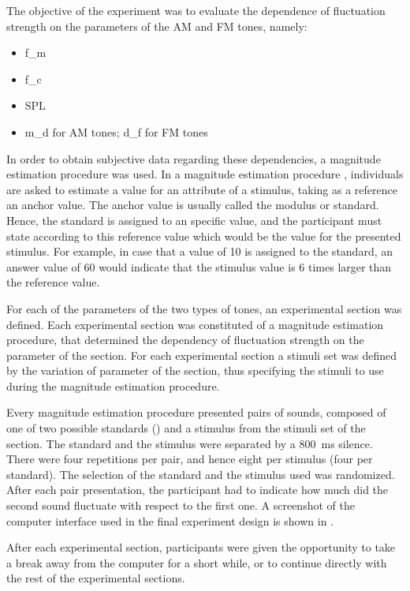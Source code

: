 \documentclass[../main.tex]{subfiles}
\begin{document}
The objective of the experiment was to evaluate the dependence of fluctuation
strength on the parameters of the \gls{AM} and \gls{FM} tones, namely:
\begin{itemize}
  \item \Gls{f_m}
  \item \Gls{f_c}
  \item \Gls{SPL}
  \item \Gls{m_d} for \gls{AM} tones; \gls{d_f} for \gls{FM} tones
\end{itemize}

In order to obtain subjective data regarding these dependencies, a magnitude
estimation procedure was used. In a magnitude estimation procedure
\cite[pp.~9]{Fastl2007Psychoacoustics}, individuals are asked to estimate a
value for an attribute of a stimulus, taking as a reference an anchor value.
The anchor value is usually called the modulus or standard. Hence, the standard
is assigned to an specific value, and the participant must state according to
this reference value which would be the value for the presented stimulus. For
example, in case that a value of 10 is assigned to the standard, an answer value
of 60 would indicate that the stimulus value is 6 times larger than the
reference value.

For each of the parameters of the two types of tones, an experimental section
was defined. Each experimental section was constituted of a magnitude estimation
procedure, that determined the dependency of fluctuation strength on the
parameter of the section. For each experimental section a stimuli set was
defined by the variation of parameter of the section, thus specifying the
stimuli to use during the magnitude estimation procedure.

Every magnitude estimation procedure presented pairs of sounds, composed of one
of two possible standards () and a stimulus from the
stimuli set of the section. The standard and the stimulus were separated by a
800~ms silence. There were four repetitions per pair, and hence eight per
stimulus (four per standard). The selection of the standard and the stimulus
used was randomized. After each pair presentation, the participant had to
indicate how much did the second sound fluctuate with respect to the first one.
A screenshot of the computer interface used in the final experiment design is
shown in .

After each experimental section, participants were given the opportunity to
take a break away from the computer for a short while, or to continue directly
with the rest of the experimental sections.
\end{document}
